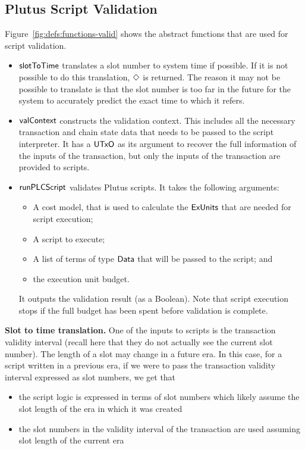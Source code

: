 \subsection{Plutus Script Validation}
Figure~\ref{fig:defs:functions-valid} shows the abstract functions that are used for script validation.

\begin{itemize}
\item $\mathsf{slotToTime}$ translates a slot number to system time if possible.
If it is not possible to do this translation, $\Diamond$ is returned.
The reason it may not be possible to translate is that the slot number
is too far in the future for the system to accurately
predict the exact time to which it refers.

\item
  $\mathsf{valContext}$ constructs the validation context.
  This includes all the necessary transaction and chain state data that needs to be passed to the script interpreter.
    It has a $\mathsf{UTxO}$ as its argument to recover the full information of the inputs of the transaction,
    but only the inputs of the transaction are provided to scripts.
\item
  $\mathsf{runPLCScript}$ validates Plutus scripts. It takes the following
  arguments:
  \begin{itemize}
  \item A cost model, that is used to calculate the $\mathsf{ExUnits}$ that are needed for script execution;
  \item A script to execute;
  \item A list of terms of type $\mathsf{Data}$ that will be passed to the script; and
  \item the execution unit budget.
  \end{itemize}
  It outputs the validation result (as a Boolean).
  Note that script execution stops if the full budget has been spent before validation is complete.
\end{itemize}


\textbf{Slot to time translation.}
One of the inputs to scripts is the transaction validity interval (recall here that
they do not actually see the current slot number). The length of a
slot may change in a future era. In this case, for a script written in a previous
era, if we were to pass the transaction validity interval expressed as slot numbers,
we get that

\begin{itemize}
  \item the script logic is expressed in terms of slot numbers
  which likely assume the slot length of the era in which it was created
  \item the slot numbers in the validity interval of the transaction are used
  assuming slot length of the current era
\end{itemize}

